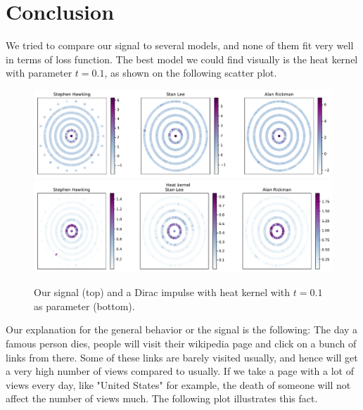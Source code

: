 \documentclass[conference]{IEEEtran}
\begin{document}
\section{Conclusion} \label{conclusion}

We tried to compare our signal to several models, and none of them fit very well in terms of loss function. The best model we could find visually is the heat kernel with parameter $t=0.1$, as shown on the following scatter plot. 

\begin{figure}[!htb]
\includegraphics[width=\linewidth]{signal_scatter.pdf}
\includegraphics[width=\linewidth]{heat_scatter.pdf}
\caption{Our signal (top) and a Dirac impulse with heat kernel  with $t=0.1$ as parameter (bottom).} 
\end{figure}

Our explanation for the general behavior or the signal is the following: 
\newline
The day a famous person dies, people will visit their wikipedia page and click on a bunch of links from there. Some of these links are barely visited usually, and hence will get a very high number of views compared to usually. If we take a page with a lot of views every day, like "United States" for example, the death of someone will not affect the number of views much. The following plot illustrates this fact. 
\end{document}
